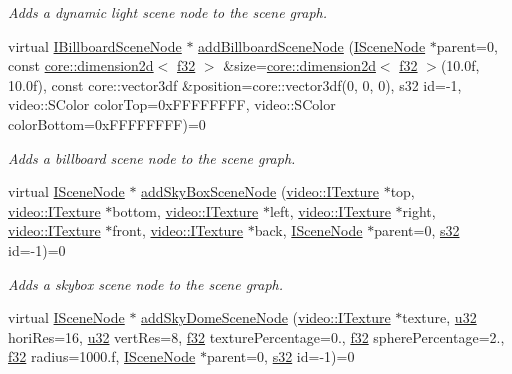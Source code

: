\begin{DoxyCompactItemize}
\begin{DoxyCompactList}\small\item\em Adds a dynamic light scene node to the scene graph. \end{DoxyCompactList}\item 
virtual \hyperlink{classirr_1_1scene_1_1IBillboardSceneNode}{I\+Billboard\+Scene\+Node} $\ast$ \hyperlink{classirr_1_1scene_1_1ISceneManager_a00266a58b97e827acd9e105806a99c3a}{add\+Billboard\+Scene\+Node} (\hyperlink{classirr_1_1scene_1_1ISceneNode}{I\+Scene\+Node} $\ast$parent=0, const \hyperlink{classirr_1_1core_1_1dimension2d}{core\+::dimension2d}$<$ \hyperlink{namespaceirr_a0277be98d67dc26ff93b1a6a1d086b07}{f32} $>$ \&size=\hyperlink{classirr_1_1core_1_1dimension2d}{core\+::dimension2d}$<$ \hyperlink{namespaceirr_a0277be98d67dc26ff93b1a6a1d086b07}{f32} $>$(10.\+0f, 10.\+0f), const core\+::vector3df \&position=core\+::vector3df(0, 0, 0), s32 id=-\/1, video\+::\+S\+Color color\+Top=0x\+F\+F\+F\+F\+F\+F\+F\+F, video\+::\+S\+Color color\+Bottom=0x\+F\+F\+F\+F\+F\+F\+F\+F)=0
\begin{DoxyCompactList}\small\item\em Adds a billboard scene node to the scene graph. \end{DoxyCompactList}\item 
virtual \hyperlink{classirr_1_1scene_1_1ISceneNode}{I\+Scene\+Node} $\ast$ \hyperlink{classirr_1_1scene_1_1ISceneManager_a2b08b9f20ec62faeffc02b9fed9fd683}{add\+Sky\+Box\+Scene\+Node} (\hyperlink{classirr_1_1video_1_1ITexture}{video\+::\+I\+Texture} $\ast$top, \hyperlink{classirr_1_1video_1_1ITexture}{video\+::\+I\+Texture} $\ast$bottom, \hyperlink{classirr_1_1video_1_1ITexture}{video\+::\+I\+Texture} $\ast$left, \hyperlink{classirr_1_1video_1_1ITexture}{video\+::\+I\+Texture} $\ast$right, \hyperlink{classirr_1_1video_1_1ITexture}{video\+::\+I\+Texture} $\ast$front, \hyperlink{classirr_1_1video_1_1ITexture}{video\+::\+I\+Texture} $\ast$back, \hyperlink{classirr_1_1scene_1_1ISceneNode}{I\+Scene\+Node} $\ast$parent=0, \hyperlink{namespaceirr_ac66849b7a6ed16e30ebede579f9b47c6}{s32} id=-\/1)=0
\begin{DoxyCompactList}\small\item\em Adds a skybox scene node to the scene graph. \end{DoxyCompactList}\item 
virtual \hyperlink{classirr_1_1scene_1_1ISceneNode}{I\+Scene\+Node} $\ast$ \hyperlink{classirr_1_1scene_1_1ISceneManager_aadf84a7a18a5ed92d9868f90c506daa7}{add\+Sky\+Dome\+Scene\+Node} (\hyperlink{classirr_1_1video_1_1ITexture}{video\+::\+I\+Texture} $\ast$texture, \hyperlink{namespaceirr_a0416a53257075833e7002efd0a18e804}{u32} hori\+Res=16, \hyperlink{namespaceirr_a0416a53257075833e7002efd0a18e804}{u32} vert\+Res=8, \hyperlink{namespaceirr_a0277be98d67dc26ff93b1a6a1d086b07}{f32} texture\+Percentage=0., \hyperlink{namespaceirr_a0277be98d67dc26ff93b1a6a1d086b07}{f32} sphere\+Percentage=2., \hyperlink{namespaceirr_a0277be98d67dc26ff93b1a6a1d086b07}{f32} radius=1000.f, \hyperlink{classirr_1_1scene_1_1ISceneNode}{I\+Scene\+Node} $\ast$parent=0, \hyperlink{namespaceirr_ac66849b7a6ed16e30ebede579f9b47c6}{s32} id=-\/1)=0

\end{DoxyCompactItemize}
